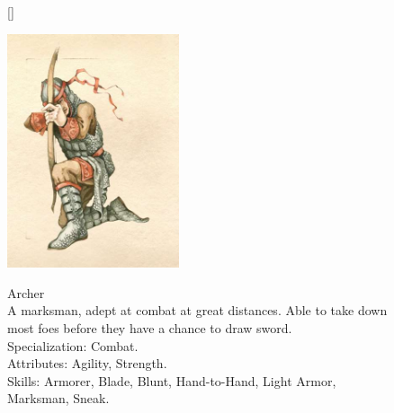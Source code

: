 \documentclass[12pt]{book}
\begin{document}
\begin{figure}[H]
[\FBwidth]
{\caption*{Archer\\

A marksman, adept at combat at great distances. Able to take down most foes before they have a chance to draw sword.\\

Specialization: Combat.\\

Attributes: Agility, Strength.\\

Skills: Armorer, Blade, Blunt, Hand-to-Hand, Light Armor, Marksman, Sneak.}\label{fig:test}}
{\includegraphics[width=0.45\textwidth]{Archer.png}}
\end{figure}
\end{document}
